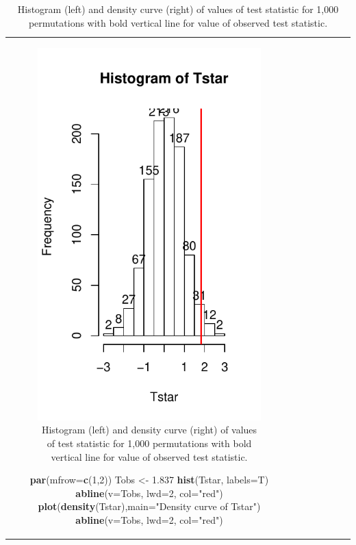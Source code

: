 \documentclass[]{book}
\newenvironment{Shaded}{\begin{snugshade}}{\end{snugshade}}
\newcommand{\KeywordTok}[1]{\textcolor[rgb]{0.13,0.29,0.53}{\textbf{#1}}}
\newcommand{\DataTypeTok}[1]{\textcolor[rgb]{0.13,0.29,0.53}{#1}}
\newcommand{\DecValTok}[1]{\textcolor[rgb]{0.00,0.00,0.81}{#1}}
\newcommand{\FloatTok}[1]{\textcolor[rgb]{0.00,0.00,0.81}{#1}}
\newcommand{\StringTok}[1]{\textcolor[rgb]{0.31,0.60,0.02}{#1}}
\newcommand{\NormalTok}[1]{#1}
\theoremstyle{definition}
\theoremstyle{definition}
\theoremstyle{remark}
\begin{document}
\begin{longtable}[]{@{}ccccccc@{}}
\begin{minipage}[b]{0.10\columnwidth}
\begin{figure}
\centering
\includegraphics{02-reintroductionToStatistics_files/figure-latex/Figure2-10-1.pdf}
\caption{\label{fig:Figure2-10}Histogram (left) and density curve (right) of values of
test statistic for 1,000 permutations with bold vertical line for value
of observed test statistic.}
\end{figure}

\begin{Shaded}
\begin{Highlighting}[]
\KeywordTok{par}\NormalTok{(}\DataTypeTok{mfrow=}\KeywordTok{c}\NormalTok{(}\DecValTok{1}\NormalTok{,}\DecValTok{2}\NormalTok{))}
\NormalTok{Tobs <-}\StringTok{ }\FloatTok{1.837}
\KeywordTok{hist}\NormalTok{(Tstar, }\DataTypeTok{labels=}\NormalTok{T)}
\KeywordTok{abline}\NormalTok{(}\DataTypeTok{v=}\NormalTok{Tobs, }\DataTypeTok{lwd=}\DecValTok{2}\NormalTok{, }\DataTypeTok{col=}\StringTok{"red"}\NormalTok{)}
\KeywordTok{plot}\NormalTok{(}\KeywordTok{density}\NormalTok{(Tstar),}\DataTypeTok{main=}\StringTok{"Density curve of Tstar"}\NormalTok{)}
\KeywordTok{abline}\NormalTok{(}\DataTypeTok{v=}\NormalTok{Tobs, }\DataTypeTok{lwd=}\DecValTok{2}\NormalTok{, }\DataTypeTok{col=}\StringTok{"red"}\NormalTok{)}
\end{Highlighting}
\end{Shaded}


\end{minipage}
\end{longtable}
\end{document}
